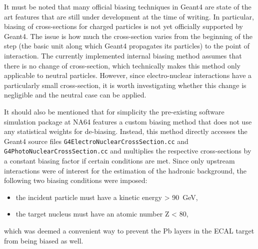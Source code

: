 It must be noted that many official biasing techniques in Geant4 are state of the art features that are still under development at the time of writing. In particular, biasing of cross-sections for charged particles is not yet officially supported by Geant4. The issue is how much the cross-section varies from the beginning of the step (the basic unit along which Geant4 propagates its particles) to the point of interaction. The currently implemented internal biasing method assumes that there is no change of cross-section, which technically makes this method only applicable to neutral particles. However, since electro-nuclear interactions have a particularly small cross-section, it is worth investigating whether this change is negligible and the neutral case can be applied.

It should also be mentioned that for simplicity the pre-existing software simulation package at NA64 features a custom biasing method that does not use any statistical weights for de-biasing. Instead, this method directly accesses the Geant4 source files \verb|G4ElectroNuclearCrossSection.cc| and \verb|G4PhotoNuclearCrossSection.cc| and multiplies the respective cross-sections by a constant biasing factor if certain conditions are met. Since only upstream interactions were of interest for the estimation of the hadronic background, the following two biasing conditions were imposed:

\begin{itemize}
    \item the incident particle must have a kinetic energy > \SI{90}{\giga\electronvolt},
    \item the target nucleus must have an atomic number Z < 80,
\end{itemize}

\noindent which was deemed a convenient way to prevent the Pb layers in the ECAL target from being biased as well. 

